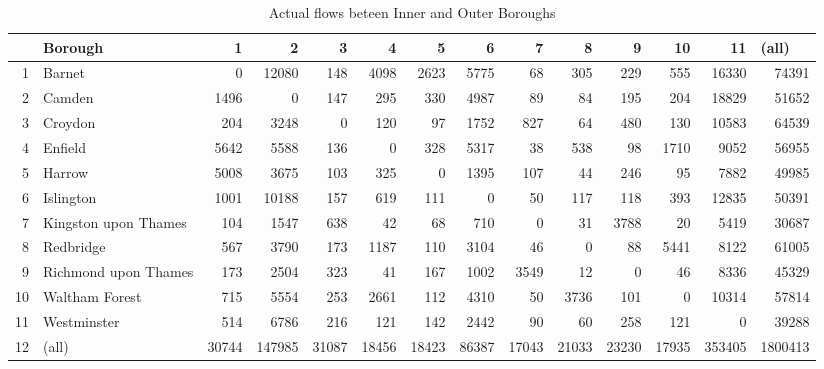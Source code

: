 \documentclass[11pt]{article} %
\begin{document}


\begin{table}
\footnotesize
\caption{Actual flows beteen Inner and Outer Boroughs}
\begin{tabular}{|r|l|r|r|r|r|r|r|r|r|r|r|r|r|}
\hline
\multicolumn{1}{|l|}{} & Borough & 1 & 2 & 3 & 4 & 5 & 6 & 7 & 8 & 9 & 10 & 11 & \multicolumn{1}{l|}{(all)} \\ \hline
1 & Barnet & 0 & 12080 & 148 & 4098 & 2623 & 5775 & 68 & 305 & 229 & 555 & 16330 & 74391 \\ \hline
2 & Camden & 1496 & 0 & 147 & 295 & 330 & 4987 & 89 & 84 & 195 & 204 & 18829 & 51652 \\ \hline
3 & Croydon & 204 & 3248 & 0 & 120 & 97 & 1752 & 827 & 64 & 480 & 130 & 10583 & 64539 \\ \hline
4 & Enfield & 5642 & 5588 & 136 & 0 & 328 & 5317 & 38 & 538 & 98 & 1710 & 9052 & 56955 \\ \hline
5 & Harrow & 5008 & 3675 & 103 & 325 & 0 & 1395 & 107 & 44 & 246 & 95 & 7882 & 49985 \\ \hline
6 & Islington & 1001 & 10188 & 157 & 619 & 111 & 0 & 50 & 117 & 118 & 393 & 12835 & 50391 \\ \hline
7 & Kingston upon Thames & 104 & 1547 & 638 & 42 & 68 & 710 & 0 & 31 & 3788 & 20 & 5419 & 30687 \\ \hline
8 & Redbridge & 567 & 3790 & 173 & 1187 & 110 & 3104 & 46 & 0 & 88 & 5441 & 8122 & 61005 \\ \hline
9 & Richmond upon Thames & 173 & 2504 & 323 & 41 & 167 & 1002 & 3549 & 12 & 0 & 46 & 8336 & 45329 \\ \hline
10 & Waltham Forest & 715 & 5554 & 253 & 2661 & 112 & 4310 & 50 & 3736 & 101 & 0 & 10314 & 57814 \\ \hline
11 & Westminster & 514 & 6786 & 216 & 121 & 142 & 2442 & 90 & 60 & 258 & 121 & 0 & 39288 \\ \hline
12 & (all) & 30744 & 147985 & 31087 & 18456 & 18423 & 86387 & 17043 & 21033 & 23230 & 17935 & 353405 & 1800413 \\ \hline
\end{tabular}
\label{Actual Flows Inner Outer}
\end{table}

\end{document}
